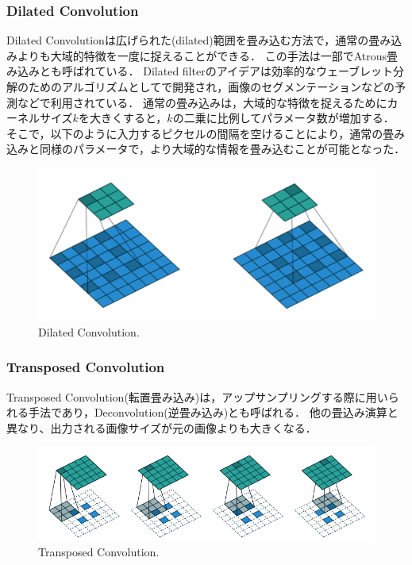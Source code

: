     \subsubsection{Dilated Convolution}
    Dilated Convolutionは広げられた(dilated)範囲を畳み込む方法で，通常の畳み込みよりも大域的特徴を一度に捉えることができる．
    この手法は一部でAtrous畳み込みとも呼ばれている．
    Dilated filterのアイデアは効率的なウェーブレット分解のためのアルゴリズム\cite{holschneider1990real}としてで開発され，画像のセグメンテーションなどの予測などで利用されている\cite{huang2017densely,lin2014microsoft}．
    通常の畳み込みは，大域的な特徴を捉えるためにカーネルサイズ$k$を大きくすると，$k$の二乗に比例してパラメータ数が増加する．
    そこで，以下のように入力するピクセルの間隔を空けることにより，通常の畳み込みと同様のパラメータで，より大域的な情報を畳み込むことが可能となった．
    \begin{figure}[ht]
        \begin{center}
            \includegraphics[width=12.0cm]{./8_appendix/img/dilated_conv}
            \caption{Dilated Convolution.}
        \end{center}
    \end{figure}

    \subsubsection{Transposed Convolution}
    Transposed Convolution(転置畳み込み)は，アップサンプリングする際に用いられる手法であり，Deconvolution(逆畳み込み)とも呼ばれる．
    他の畳込み演算と異なり、出力される画像サイズが元の画像よりも大きくなる．
    \begin{figure}[ht]
        \begin{center}
            \includegraphics[width=15.0cm]{./8_appendix/img/Deconvolution}
            \caption{Transposed Convolution.}
        \end{center}
    \end{figure}

